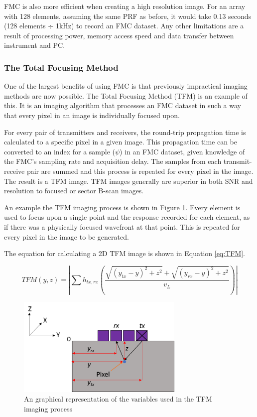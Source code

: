 FMC is also more efficient when creating a high resolution image. For an array with 128 elements, assuming the same PRF as before, it would take 0.13 seconds (128 elements $\div$ 1kHz)  to record an FMC dataset. Any other limitations are a result of processing power, memory access speed and data transfer between instrument and PC.

\subsubsection{The Total Focusing Method}\label{sec:TFM}

One of the largest benefits of using FMC is that previously impractical imaging methods are now possible. The Total Focusing Method (TFM) is an example of this. It is an imaging algorithm that processes an FMC dataset in such a way that every pixel in an image is individually focused upon.

For every pair of transmitters and receivers, the round-trip propagation time is calculated to a specific pixel in a given image. This propagation time can be converted to an index for a sample ($\psi$) in an FMC dataset, given knowledge of the FMC's sampling rate and acquisition delay. The samples from each transmit-receive pair are summed and this process is repeated for every pixel in the image. The result is a TFM image. TFM images generally are superior in both SNR and resolution to focused or sector B-scan images. 

An example the TFM imaging process is shown in Figure \ref{fig:TFM_illus}. Every element is used to focus upon a single point and the response recorded for each element, as if there was a physically focused wavefront at that point. This is repeated for every pixel in the image to be generated.

The equation for calculating a 2D TFM image is shown in Equation \ref{eq:TFM}\cite{holmes_post-processing_2005}. 

 \begin{equation} \label{eq:TFM}
TFM(y,z) = | \sum h_{tx,rx} (\frac{\sqrt{(y_{tx} - y)^2 + z^2} + \sqrt{(y_{rx} - y)^2 + z^2}}{v_L}) |
 \end{equation}

\begin{figure}[htbp]
\centering
		\includegraphics[width=80mm]{TFM2.png} \hspace{20mm}
		\caption{An graphical representation of the variables used in the TFM imaging process}
		\label{fig:TFM_illus}
\end{figure}

